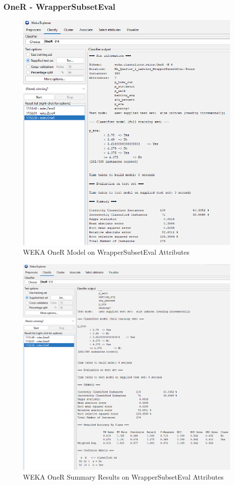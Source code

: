 \documentclass[12pt]{article}
\begin{document}
\subsubsection{OneR - WrapperSubsetEval}
\begin{figure}[h!]
    \includegraphics[scale=0.4]{./images/WrapperSubsetEval/OneR-Model.png}
\centering
    \caption{WEKA OneR Model on WrapperSubsetEval Attributes}
\end{figure}
\newpage
\begin{figure}[h!]
    \includegraphics[scale=0.4]{./images/WrapperSubsetEval/OneR-Summary.png}
\centering
    \caption{WEKA OneR Summary Results on WrapperSubsetEval Attributes}
\end{figure}
\end{document}
